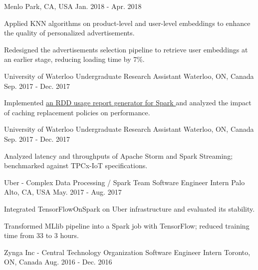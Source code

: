 \begin{cventries}
{Menlo Park, CA, USA} %
{Jan. 2018 - Apr. 2018} %
{ %
\begin{cvitems}
\item {Applied KNN algorithms on product-level and user-level embeddings to enhance the quality of personalized advertisements.}
\item {Redesigned the advertisements selection pipeline to retrieve user embeddings at an earlier stage, reducing loading time by 7\%.}
\end{cvitems}
}
\cventry
{University of Waterloo} %
{Undergraduate Research Assistant} %
{Waterloo, ON, Canada} %
{Sep. 2017 - Dec. 2017} %
{ %
\begin{cvitems}
\item {Implemented \href{https://github.com/ljj7975/CachedRDDReportGenerator}{an RDD usage report generator for Spark {\small \faGithub}} and analyzed the impact of caching replacement policies on performance.}
\end{cvitems}
}
\cventry
{University of Waterloo} %
{Undergraduate Research Assistant} %
{Waterloo, ON, Canada} %
{Sep. 2017 - Dec. 2017} %
{ %
\begin{cvitems}
\item {Analyzed latency and throughputs of Apache Storm and Spark Streaming; benchmarked against TPCx-IoT specifications.}
\end{cvitems}
}
\cventry
{Uber - Complex Data Processing / Spark Team} %
{Software Engineer Intern} %
{Palo Alto, CA, USA} %
{May. 2017 - Aug. 2017} %
{ %
\begin{cvitems}
\item {Integrated TensorFlowOnSpark on Uber infrastructure and evaluated its stability.}
\item {Transformed MLlib pipeline into a Spark job with TensorFlow; reduced training time from 33 to 3 hours.}
\end{cvitems}
}
\cventry
{Zynga Inc - Central Technology Organization} %
{Software Engineer Intern} %
{Toronto, ON, Canada} %
{Aug. 2016 - Dec. 2016} %
{ %
}
\end{cventries}
